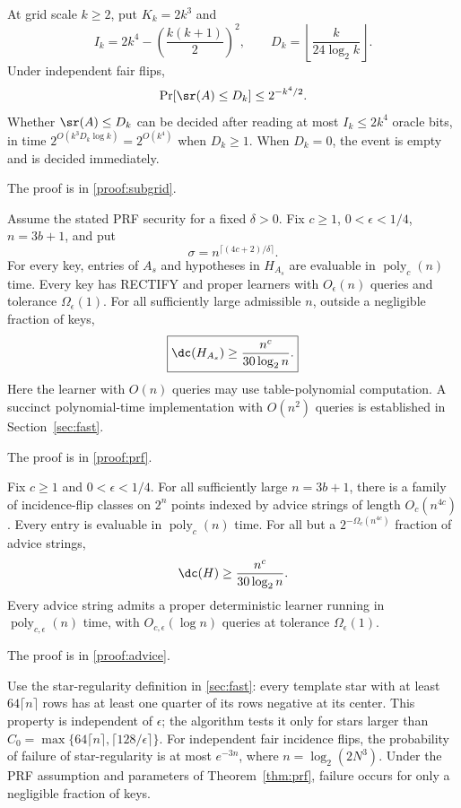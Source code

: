 \begin{lemma}\label{lem:subgrid}
At grid scale $k\ge2$, put $K_k=2k^3$ and
\[
 I_k=2k^4-\left(\frac{k(k+1)}2\right)^2,
 \qquad D_k=\left\lfloor\frac{k}{24\log_2 k}\right\rfloor.
\]
Under independent fair flips,
\[
 \Pr[\sr(A)\le D_k]\le2^{-k^4/2}.
\]
Whether $\sr(A)\le D_k$ can be decided after reading at most $I_k\le2k^4$ oracle bits, in time $2^{O(k^3D_k\log k)}=2^{O(k^4)}$ when $D_k\ge1$. When $D_k=0$, the event is empty and is decided immediately.
\end{lemma}
\noindent The proof is in \cref{proof:subgrid}.
\begin{theorem}\label{thm:prf}
Assume the stated PRF security for a fixed $\delta>0$. Fix $c\ge1$, $0<\epsilon<1/4$, $n=3b+1$, and put
\[
 \sigma=n^{\lceil(4c+2)/\delta\rceil}.
\]
For every key, entries of $A_s$ and hypotheses in $H_{A_s}$ are evaluable in $\operatorname{poly}_c(n)$ time. Every key has RECTIFY and proper learners with $O_\epsilon(n)$ queries and tolerance $\Omega_\epsilon(1)$. For all sufficiently large admissible $n$, outside a negligible fraction of keys,
\[
 \boxed{\dc(H_{A_s})\ge\frac{n^c}{30\log_2n}.}
\]
Here the learner with $O(n)$ queries may use table-polynomial computation. A succinct polynomial-time implementation with $O(n^2)$ queries is established in Section~\ref{sec:fast}.
\end{theorem}
\noindent The proof is in \cref{proof:prf}.
\begin{proposition}\label{prop:advice}
Fix $c\ge1$ and $0<\epsilon<1/4$. For all sufficiently large $n=3b+1$, there is a family of incidence-flip classes on $2^n$ points indexed by advice strings of length $O_c(n^{4c})$. Every entry is evaluable in $\operatorname{poly}_c(n)$ time. For all but a $2^{-\Omega_c(n^{4c})}$ fraction of advice strings,
\[
 \dc(H)\ge\frac{n^c}{30\log_2 n}.
\]
Every advice string admits a proper deterministic learner running in $\operatorname{poly}_{c,\epsilon}(n)$ time, with $O_{c,\epsilon}(\log n)$ queries at tolerance $\Omega_\epsilon(1)$.
\end{proposition}
\noindent The proof is in \cref{proof:advice}.
\begin{lemma}\label{lem:regularstars}
Use the star-regularity definition in \cref{sec:fast}: every template star with at least $64\lceil n\rceil$ rows has at least one quarter of its rows negative at its center. This property is independent of $\epsilon$; the algorithm tests it only for stars larger than $C_0=\max\{64\lceil n\rceil,\lceil128/\epsilon\rceil\}$. For independent fair incidence flips, the probability of failure of star-regularity is at most $e^{-3n}$, where $n=\log_2(2N^3)$. Under the PRF assumption and parameters of Theorem~\ref{thm:prf}, failure occurs for only a negligible fraction of keys.
\end{lemma}
